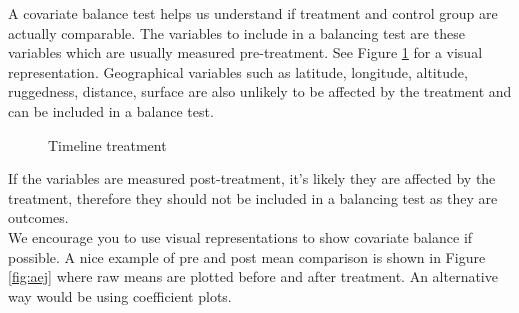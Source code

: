 \documentclass[11pt, oneside]{article}   	%
\begin{document}
\newpage

A covariate balance test helps us understand if treatment and control group are actually comparable. The variables to include in a balancing test are these variables which are usually measured pre-treatment. See Figure  \ref{fig:tikz} for a visual representation. Geographical variables such as latitude, longitude, altitude, ruggedness, distance, surface are also unlikely to be affected by the treatment and can be included in a balance test. \\


\begin{figure}[H]
\caption{\label{fig:tikz} Timeline treatment }

\end{figure}


\vspace{1cm}


If the variables are measured post-treatment, it's likely they are affected by the treatment, therefore they should not be included in a balancing test as they are outcomes. \\

We encourage you to use visual representations to show covariate balance if possible. A nice example of pre and post mean comparison is shown in Figure \ref{fig:aej} where raw means are plotted before and after treatment. An alternative way would be using coefficient plots.
\end{document}
